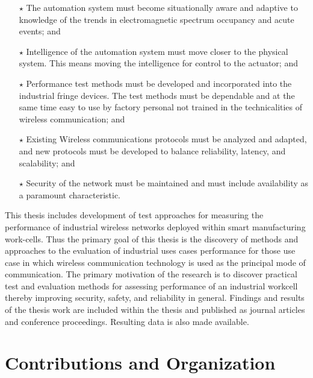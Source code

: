 \documentclass[twocolumn]{IEEEtran}
\begin{document}
		\begin{itemize}
			\item[$\star$] The automation system must become situationally aware and adaptive to knowledge of the trends in electromagnetic spectrum occupancy and acute events; and
			
			\item[$\star$] Intelligence of the automation system must move closer to the physical system.  This means moving the intelligence for control to the actuator; and  
			
			\item[$\star$] Performance test methods must be developed and incorporated into the industrial fringe devices.  The test methods must be dependable and at the same time easy to use by factory personal not trained in the technicalities of wireless communication; and
			
			\item[$\star$] Existing Wireless communications protocols must be analyzed and adapted, and new protocols must be developed to balance reliability, latency, and scalability; and
			 
			\item[$\star$] Security of the network must be maintained and must include availability as a paramount characteristic.
		\end{itemize}
		
		This thesis includes development of test approaches for measuring the performance of industrial wireless networks deployed within smart manufacturing work-cells.  Thus the primary goal of this thesis is the discovery of methods and approaches to the evaluation of industrial uses cases performance for those use case in which wireless communication technology is used as the principal mode of communication.  The primary motivation of the research is to discover practical test and evaluation methods for assessing performance of an industrial workcell thereby improving security, safety, and reliability in general.   Findings and results of the thesis work are included within the thesis and published as journal articles and conference proceedings.  Resulting data is also made available.
		
		\section*{Contributions and Organization}
		
\end{document}
